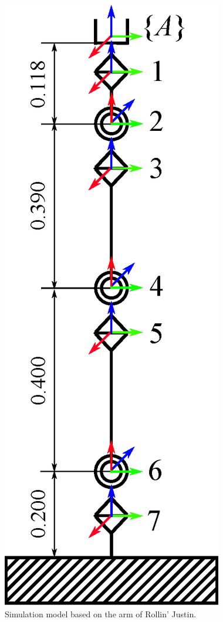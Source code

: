 \begin{figure}[t]
\begin{minipage}[h]{0.22\linewidth}
  \end{minipage}
  \hspace{5em}
  \begin{minipage}[h]{0.22\linewidth}
    \centering
    \includegraphics[width=1.0\linewidth]{fig/chapter6/results/spatial/control_model_3.eps}
  \end{minipage}
  \vspace{1em}
  \caption{Simulation model based on the arm of Rollin' Justin.}
  \label{fig:MODEL_JUSTIN}
\end{figure}
